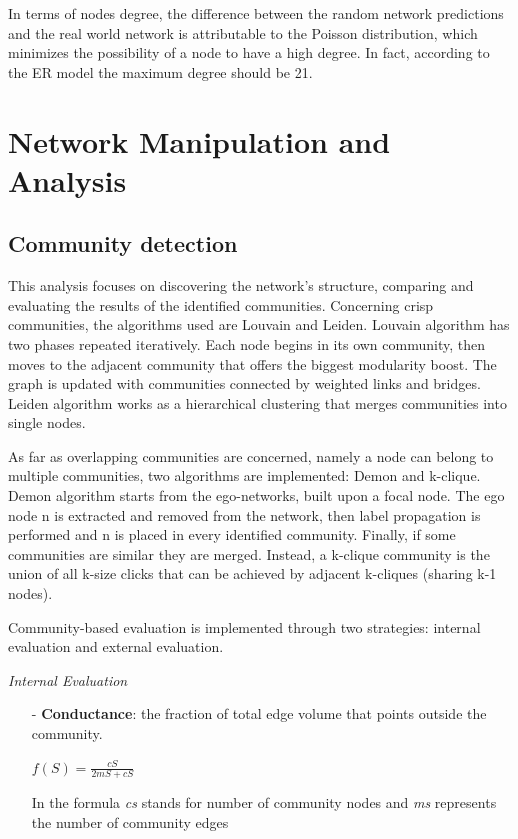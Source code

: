 \documentclass[sigchi]{acmart}
\begin{document}
In terms of nodes degree, the difference between the random network predictions and the real world network is attributable to the Poisson distribution, which minimizes the possibility of a node to have a high degree. In fact, according to the ER model the maximum degree should be 21.

\section{Network Manipulation and Analysis}

\subsection{Community detection}
This analysis focuses on discovering the network's structure, comparing and evaluating the results of the identified communities. 
Concerning crisp communities, the algorithms used are Louvain and Leiden.
Louvain algorithm has two phases repeated iteratively. Each node begins in its own community, then moves to the adjacent community that offers the biggest modularity boost. The graph is updated with communities connected by weighted links and bridges.
Leiden algorithm works as a hierarchical clustering that merges communities into single nodes. 

As far as overlapping communities are concerned, namely a node can belong to multiple communities, two algorithms are implemented: Demon and k-clique. Demon algorithm starts from the ego-networks, built upon a focal node. 
The ego node n is extracted and removed from the network, then label propagation is performed and n is placed in every identified community. Finally, if some communities are similar they are merged. 
Instead, a k-clique community is the union of all k-size clicks that can be achieved by adjacent k-cliques (sharing k-1 nodes).

Community-based evaluation is implemented through two strategies: internal evaluation and external evaluation.\vspace{8pt}

\vspace{5pt}
{\fontsize{10}{10}\selectfont \textit{Internal Evaluation }}

\begin{itemize}
  \item [-]\textbf{Conductance}: the fraction of total edge volume that points outside the community. \newline
\begin{center}
$f(S) = \displaystyle\frac{cS}{2mS + cS}$
\end{center}
 
\vspace{5pt}
\begin{flushleft}
In the formula \textit{cs} stands for number of community nodes and \textit{ms} represents the number of community edges
 \end{flushleft}
\vspace{10pt}
\end{itemize}
\end{document}
